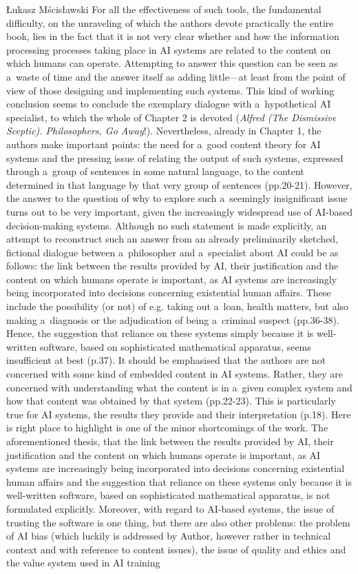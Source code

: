 \begin{newrevengenv}{Łukasz Mścisławski}
{} For all the effectiveness of such tools, the fundamental difficulty, on the unraveling of which the authors devote practically the entire book, lies in the fact that it is not very clear whether and how the information processing processes taking place in AI systems are related to the content on which humans can operate. Attempting to answer this question can be seen as a~waste of time and the answer itself as adding little---at least from the point of view of those designing and implementing such systems. This kind of working conclusion seems to conclude the exemplary dialogue with a~hypothetical AI specialist, to which the whole of Chapter 2 is devoted (\textit{Alfred (The Dismissive Sceptic). Philosophers, Go Away}!). Nevertheless, already in Chapter 1, the authors make important points: the need for a~good content theory for AI systems and the pressing issue of relating the output of such systems, expressed through a~group of sentences in some natural language, to the content determined in that language by that very group of sentences (pp.20-21). However, the answer to the question of why to explore such a~seemingly insignificant issue turns out to be very important, given the increasingly widespread use of AI-based decision-making systems. Although no such statement is made explicitly, an attempt to reconstruct such an answer from an already preliminarily sketched, fictional dialogue between a~philosopher and a~specialist about AI could be as follows: the link between the results provided by AI, their justification and the content on which humans operate is important, as AI systems are increasingly being incorporated into decisions concerning existential human affairs. These include the possibility (or not) of e.g. taking out a~loan, health matters, but also making a~diagnosis or the adjudication of being a~criminal suspect (pp.36-38). Hence, the suggestion that reliance on these systems simply because it is well-written software, based on sophisticated mathematical apparatus, seems insufficient at best (p.37). It should be emphasised that the authors are not concerned with some kind of embedded content in AI systems. Rather, they are concerned with understanding what the content is in a~given complex system and how that content was obtained by that system (pp.22-23). This is particularly true for AI systems, the results they provide and their interpretation (p.18). Here is right place to highlight is one of the minor shortcomings of the work. The aforementioned thesis, that the link between the results provided by AI, their justification and the content on which humans operate is important, as AI systems are increasingly being incorporated into decisions concerning existential human affairs and the suggestion that reliance on these systems only because it is well-written software, based on sophisticated mathematical apparatus, is not formulated explicitly. Moreover, with regard to AI-based systems, the issue of trusting the software is one thing, but there are also other problems: the problem of AI bias (which luckily is addressed by Author, however rather in technical context and with reference to content issues), the issue of quality and ethics and the value system used in AI training 

\end{newrevengenv}
